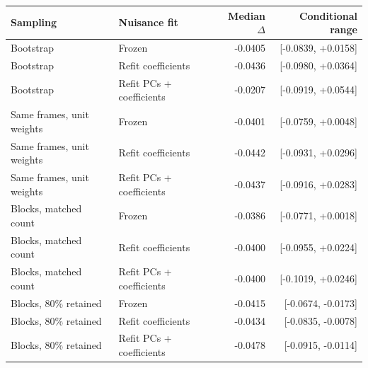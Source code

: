 \begin{tabular}{llrr}
\toprule
Sampling & Nuisance fit & Median $\Delta$ & Conditional range \\
\midrule
Bootstrap & Frozen & -0.0405 & [-0.0839, +0.0158] \\
Bootstrap & Refit coefficients & -0.0436 & [-0.0980, +0.0364] \\
Bootstrap & Refit PCs + coefficients & -0.0207 & [-0.0919, +0.0544] \\
Same frames, unit weights & Frozen & -0.0401 & [-0.0759, +0.0048] \\
Same frames, unit weights & Refit coefficients & -0.0442 & [-0.0931, +0.0296] \\
Same frames, unit weights & Refit PCs + coefficients & -0.0437 & [-0.0916, +0.0283] \\
Blocks, matched count & Frozen & -0.0386 & [-0.0771, +0.0018] \\
Blocks, matched count & Refit coefficients & -0.0400 & [-0.0955, +0.0224] \\
Blocks, matched count & Refit PCs + coefficients & -0.0400 & [-0.1019, +0.0246] \\
Blocks, 80\% retained & Frozen & -0.0415 & [-0.0674, -0.0173] \\
Blocks, 80\% retained & Refit coefficients & -0.0434 & [-0.0835, -0.0078] \\
Blocks, 80\% retained & Refit PCs + coefficients & -0.0478 & [-0.0915, -0.0114] \\
\bottomrule
\end{tabular}
